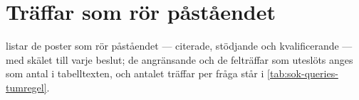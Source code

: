 \section{Träffar som rör påståendet}
\label{sec:tum-traffar}

 listar de poster som rör påståendet ---
citerade, stödjande och kvalificerande --- med skälet till varje beslut;
de angränsande och de felträffar som uteslöts anges som antal i
tabelltexten, och antalet träffar per fråga står i
\cref{tab:sok-queries-tumregel}.



